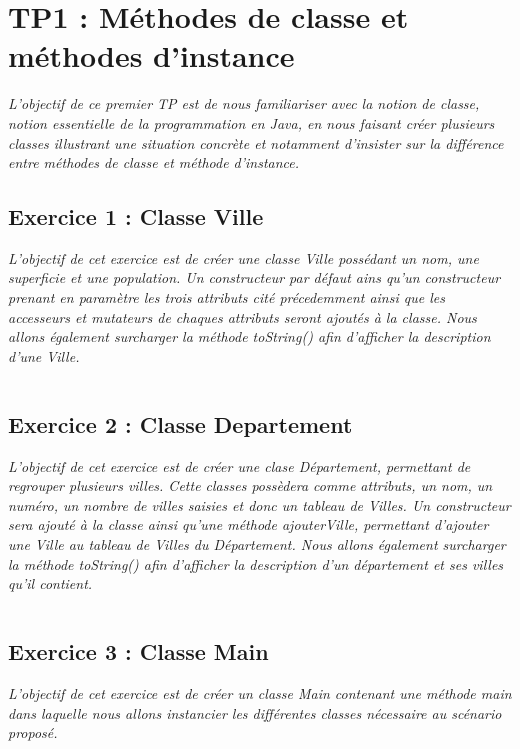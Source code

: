 \chapter{TP1 : Méthodes de classe et méthodes d'instance}
\textit{L’objectif de ce premier TP est de nous familiariser avec la notion de classe, notion essentielle de la programmation en Java, en nous faisant créer plusieurs classes illustrant une situation concrète et notamment d’insister sur la différence entre méthodes de classe et méthode d’instance.}

\section{Exercice 1 : Classe Ville}
\textit{L'objectif de cet exercice est de créer une classe Ville possédant un nom, une superficie et une population. Un constructeur par défaut ains qu'un constructeur prenant en paramètre les trois attributs cité précedemment ainsi que les accesseurs et mutateurs de chaques attributs seront ajoutés à la classe. Nous allons également surcharger la méthode toString() afin d'afficher la description d'une Ville.}
\inputminted[linenos,firstline=3,lastline=90]{java}{../sources/src/tp1/Ville.java}

\section{Exercice 2 : Classe Departement}
\textit{L'objectif de cet exercice est de créer une clase Département, permettant de regrouper plusieurs villes. Cette classes possèdera comme attributs, un nom, un numéro, un nombre de villes saisies et donc un tableau de Villes. Un constructeur sera ajouté à la classe ainsi qu'une méthode ajouterVille, permettant d'ajouter une Ville au tableau de Villes du Département. Nous allons également surcharger la méthode toString() afin d'afficher la description d'un département et ses villes qu'il contient.}
\inputminted[linenos,firstline=3,lastline=80]{java}{../sources/src/tp1/Departement.java}

\section{Exercice 3 : Classe Main}
\textit{L'objectif de cet exercice est de créer un classe Main contenant une méthode main dans laquelle nous allons instancier les différentes classes nécessaire au scénario proposé.}
\inputminted[linenos,firstline=3,lastline=29]{java}{../sources/src/tp1/Main.java}

